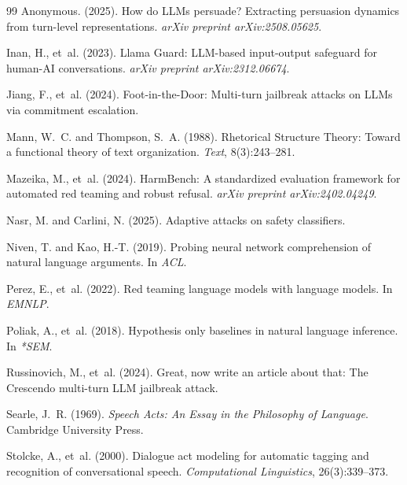 \documentclass[11pt]{article}
\begin{document}
\begin{thebibliography}{99}
{Anonymous}. (2025).
\newblock How do LLMs persuade? Extracting persuasion dynamics from turn-level representations.
\newblock \emph{arXiv preprint arXiv:2508.05625}.

Inan, H., et~al. (2023).
\newblock Llama Guard: LLM-based input-output safeguard for human-AI conversations.
\newblock \emph{arXiv preprint arXiv:2312.06674}.

Jiang, F., et~al. (2024).
\newblock Foot-in-the-Door: Multi-turn jailbreak attacks on LLMs via commitment escalation.

Mann, W.~C. and Thompson, S.~A. (1988).
\newblock Rhetorical Structure Theory: Toward a functional theory of text organization.
\newblock \emph{Text}, 8(3):243--281.

Mazeika, M., et~al. (2024).
\newblock HarmBench: A standardized evaluation framework for automated red teaming and robust refusal.
\newblock \emph{arXiv preprint arXiv:2402.04249}.

Nasr, M. and Carlini, N. (2025).
\newblock Adaptive attacks on safety classifiers.

Niven, T. and Kao, H.-T. (2019).
\newblock Probing neural network comprehension of natural language arguments.
\newblock In \emph{ACL}.

Perez, E., et~al. (2022).
\newblock Red teaming language models with language models.
\newblock In \emph{EMNLP}.

Poliak, A., et~al. (2018).
\newblock Hypothesis only baselines in natural language inference.
\newblock In \emph{*SEM}.

Russinovich, M., et~al. (2024).
\newblock Great, now write an article about that: The Crescendo multi-turn LLM jailbreak attack.

Searle, J.~R. (1969).
\newblock \emph{Speech Acts: An Essay in the Philosophy of Language}.
\newblock Cambridge University Press.

Stolcke, A., et~al. (2000).
\newblock Dialogue act modeling for automatic tagging and recognition of conversational speech.
\newblock \emph{Computational Linguistics}, 26(3):339--373.


\end{thebibliography}
\end{document}
